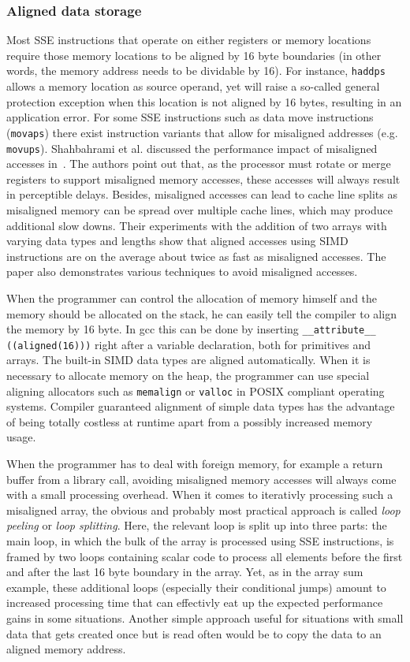 \subsubsection{Aligned data storage} 
Most SSE instructions that operate on either registers or memory locations require those memory locations to be aligned by 16 byte boundaries (in other words, the memory address needs to be dividable by 16). For instance, \texttt{haddps} allows a memory location as source operand, yet will raise a so-called general protection exception when this location is not aligned by 16 bytes, resulting in an application error. For some SSE instructions such as data move instructions (\texttt{movaps}) there exist instruction variants that allow for misaligned addresses (e.g. \texttt{movups}). Shahbahrami et al. discussed the performance impact of misaligned accesses in~\cite{shahbahrami2006misaligned}. The authors point out that, as the processor must rotate or merge registers to support misaligned memory accesses, these accesses will always result in perceptible delays. Besides, misaligned accesses can lead to cache line splits as misaligned memory can be spread over multiple cache lines, which may produce additional slow downs. Their experiments with the addition of two arrays with varying data types and lengths show that aligned accesses using SIMD instructions are on the average about twice as fast as misaligned accesses. The paper also demonstrates various techniques to avoid misaligned accesses.

When the programmer can control the allocation of memory himself and the memory should be allocated on the stack, he can easily tell the compiler to align the memory by 16 byte. In gcc this can be done by inserting \texttt{\_\_attribute\_\_ ((aligned(16)))} right after a variable declaration, both for primitives and arrays. The built-in SIMD data types are aligned automatically. When it is necessary to allocate memory on the heap, the programmer can use special aligning allocators such as \texttt{memalign} or \texttt{valloc} in POSIX compliant operating systems. Compiler guaranteed alignment of simple data types has the advantage of being totally costless at runtime apart from a possibly increased memory usage. 

When the programmer has to deal with foreign memory, for example a return buffer from a library call, avoiding misaligned memory accesses will always come with a small processing overhead. When it comes to iterativly processing such a misaligned array, the obvious and probably most practical approach is called \emph{loop peeling} or \emph{loop splitting}. Here, the relevant loop is split up into three parts: the main loop, in which the bulk of the array is processed using SSE instructions, is framed by two loops containing scalar code to process all elements before the first and after the last 16 byte boundary in the array. Yet, as in the array sum example, these additional loops (especially their conditional jumps) amount to increased processing time that can effectivly eat up the expected performance gains in some situations. Another simple approach useful for situations with small data that gets created once but is read often would be to copy the data to an aligned memory address.


